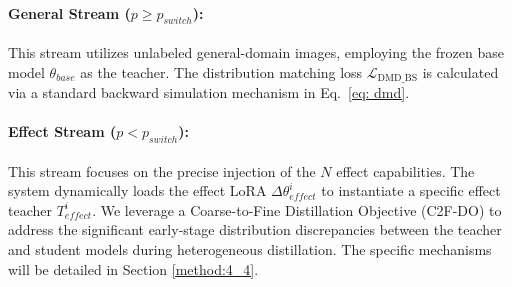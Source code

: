 \documentclass{llmxive}
\begin{document}
\paragraph{General Stream (\texorpdfstring{$p \ge p_{switch}$}{p pswitch}):} This stream utilizes unlabeled general-domain images, employing the frozen base model $\theta_{base}$ as the teacher. The distribution matching loss $\mathcal{L}_{\text{DMD\_BS}}$ is calculated via a standard backward simulation mechanism in Eq.~\ref{eq: dmd}.
\paragraph{Effect Stream (\texorpdfstring{$p < p_{switch}$}{p < pswitch}):}
This stream focuses on the precise injection of the $N$ effect capabilities. The system dynamically loads the effect LoRA $\Delta\theta_{effect}^{i}$ to instantiate a specific effect teacher $T_{effect}^{i}$. 
We leverage a Coarse-to-Fine Distillation Objective (C2F-DO) to address the significant early-stage distribution discrepancies between the teacher and student models during heterogeneous distillation. The specific mechanisms will be detailed in Section \ref{method:4_4}.
\end{document}
